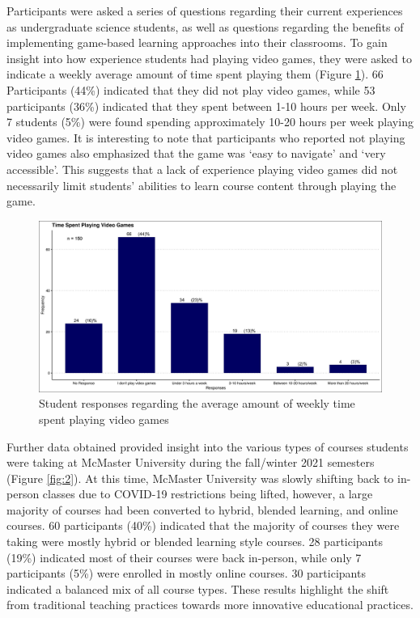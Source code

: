 \documentclass{article}
\providecommand{\figref}[1]{(Figure \ref{#1})}  %
\begin{document}
Participants were asked a series of questions regarding their current experiences as undergraduate science students, as well as questions regarding the benefits of implementing game-based learning approaches into their classrooms. To gain insight into how experience students had playing video games, they were asked to indicate a weekly average amount of time spent playing them \figref{fig:1}. 66 Participants (44\%) indicated that they did not play video games, while 53 participants (36\%) indicated that they spent between 1-10 hours per week. Only 7 students (5\%) were found spending approximately 10-20 hours per week playing video games. It is interesting to note that participants who reported not playing video games also emphasized that the game was `easy to navigate' and `very accessible'. This suggests that a lack of experience playing video games did not necessarily limit students' abilities to learn course content through playing the game.

\begin{figure}[H]
	\includegraphics[width=\textwidth]{figures_4f06/time_spent_playing_videogames.jpg}
	\caption{Student responses regarding the average amount of weekly time spent playing video games}
	\label{fig:1}
\end{figure}

Further data obtained provided insight into the various types of courses students were taking at McMaster University during the fall/winter 2021 semesters \figref{fig:2}. At this time, McMaster University was slowly shifting back to in-person classes due to COVID-19 restrictions being lifted, however, a large majority of courses had been converted to hybrid, blended learning, and online courses. 60 participants (40\%) indicated that the majority of courses they were taking were mostly hybrid or blended learning style courses. 28 participants (19\%) indicated most of their courses were back in-person, while only 7 participants (5\%) were enrolled in mostly online courses. 30 participants indicated a balanced mix of all course types. These results highlight the shift from traditional teaching practices towards more innovative educational practices.
\end{document}

